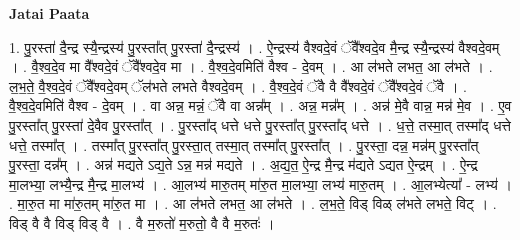 \documentclass[17pt]{extarticle}
\begin{document}
\textbf{Jatai Paata} \newline

1. पु॒रस्ता॑ दै॒न्द्र स्यै॒न्द्रस्य॑ पु॒रस्ता᳚त् पु॒रस्ता॑ दै॒न्द्रस्य॑ । . ऐ॒न्द्रस्य॑ वैश्वदे॒वं ॅवै᳚श्वदे॒व मै॒न्द्र स्यै॒न्द्रस्य॑ वैश्वदे॒वम् । . वै॒श्व॒दे॒व मा वै᳚श्वदे॒वं ॅवै᳚श्वदे॒व मा । . वै॒श्व॒दे॒वमिति॑ वैश्व - दे॒वम् । . आ ल॑भते लभत॒ आ ल॑भते । . ल॒भ॒ते॒ वै॒श्व॒दे॒वं ॅवै᳚श्वदे॒वम् ॅल॑भते लभते वैश्वदे॒वम् । . वै॒श्व॒दे॒वं ॅवै वै वै᳚श्वदे॒वं ॅवै᳚श्वदे॒वं ॅवै । . वै॒श्व॒दे॒वमिति॑ वैश्व - दे॒वम् । . वा अन्न॒ मन्नं॒ ॅवै वा अन्न᳚म् । . अन्न॒ मन्न᳚म् । . अन्न॑ मे॒वै वान्न॒ मन्न॑ मे॒व । . ए॒व पु॒रस्ता᳚त् पु॒रस्ता॑ दे॒वैव पु॒रस्ता᳚त् । . पु॒रस्ता᳚द् धत्ते धत्ते पु॒रस्ता᳚त् पु॒रस्ता᳚द् धत्ते । . ध॒त्ते॒ तस्मा॒त् तस्मा᳚द् धत्ते धत्ते॒ तस्मा᳚त् । . तस्मा᳚त् पु॒रस्ता᳚त् पु॒रस्ता॒त् तस्मा॒त् तस्मा᳚त् पु॒रस्ता᳚त् । . पु॒रस्ता॒ दन्न॒ मन्न॑म् पु॒रस्ता᳚त् पु॒रस्ता॒ दन्न᳚म् । . अन्न॑ मद्यते ऽद्य॒ते ऽन्न॒ मन्न॑ मद्यते । . अ॒द्य॒त॒ ऐ॒न्द्र मै॒न्द्र म॑द्यते ऽद्यत ऐ॒न्द्रम् । . ऐ॒न्द्र मा॒लभ्या॒ लभ्यै॒न्द्र मै॒न्द्र मा॒लभ्य॑ । . आ॒लभ्य॑ मारु॒तम् मा॑रु॒त मा॒लभ्या॒ लभ्य॑ मारु॒तम् । . आ॒लभ्येत्या᳚ - लभ्य॑ । . मा॒रु॒त मा मा॑रु॒तम् मा॑रु॒त मा । . आ ल॑भते लभत॒ आ ल॑भते । . ल॒भ॒ते॒ विड् विळ् ल॑भते लभते॒ विट् । . विड् वै वै विड् विड् वै । . वै म॒रुतो॑ म॒रुतो॒ वै वै म॒रुतः॑ । \newline
\end{document}
